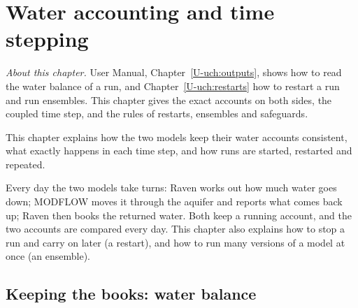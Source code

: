 \chapter{Water accounting and time stepping}\label{ch:c5}
\noindent\emph{About this chapter.} User Manual, Chapter~\ref{U-uch:outputs}, shows how to read the water
balance of a run, and Chapter~\ref{U-uch:restarts} how to restart a run and run ensembles. This chapter gives the exact
accounts on both sides, the coupled time step, and the rules of restarts, ensembles and safeguards.

This chapter explains how the two models keep their water accounts consistent, what exactly happens in each time step,
and how runs are started, restarted and repeated.

\begin{plain}
Every day the two models take turns: Raven works out how much water goes down; MODFLOW moves it through the aquifer and
reports what comes back up; Raven then books the returned water. Both keep a running account, and the two accounts are
compared every day. This chapter also explains how to stop a run and carry on later (a restart), and how to run many
versions of a model at once (an ensemble).
\end{plain}

\section{Keeping the books: water balance}\label{ch:balance}
